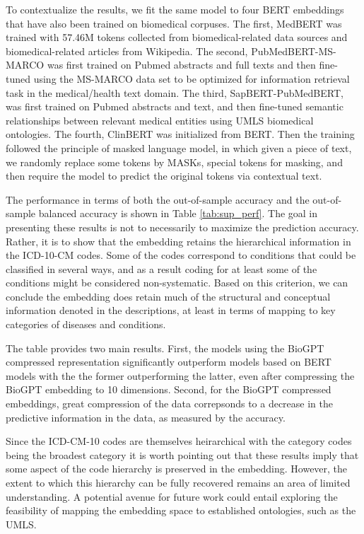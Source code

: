 \documentclass{bmcart}
\begin{document}
To contextualize the results, we fit the same model to four 
BERT embeddings that
have also been trained on biomedical corpuses. The first, MedBERT \cite{medbert}
was trained with 57.46M tokens collected from biomedical-related data sources 
and biomedical-related articles from Wikipedia. The second, 
PubMedBERT-MS-MARCO \cite{pubmedbertqa} was first trained on Pubmed abstracts 
and full texts and then fine-tuned using the MS-MARCO data set \cite{msmarco} 
to be optimized for information retrieval task in the medical/health text 
domain. The third, SapBERT-PubMedBERT, was first trained on Pubmed abstracts 
and text, and then fine-tuned semantic relationships between relevant
medical entities using UMLS \cite{umls} biomedical ontologies. The fourth, 
ClinBERT \cite{huang2019} was initialized from BERT. Then the training followed the principle of masked language model, in which given a piece of text, we randomly replace some tokens by MASKs, special tokens for masking, and then require the model to predict the original tokens via contextual text. 

The performance in terms of both the out-of-sample accuracy and
the out-of-sample balanced accuracy \cite{balancedaccuracy} is shown in 
Table \ref{tab:sup_perf}. The goal 
in presenting these results is not to necessarily to 
maximize the prediction accuracy. Rather, it is to show that the embedding 
retains the
hierarchical information in the ICD-10-CM codes. Some of the codes correspond to
conditions that could be classified in several ways, and as a result coding
for at least some of the conditions might be considered non-systematic.
Based on this criterion, we can conclude the embedding does retain much of the 
structural and conceptual information denoted in the descriptions, at least in 
terms of mapping to key categories of diseases and conditions.

The table provides two main results. First, the models using the BioGPT 
compressed representation significantly outperform models based on BERT
models with the the former outperforming the latter, even after compressing
the BioGPT embedding to 10 dimensions. Second, for the BioGPT compressed
embeddings, great compression of the data correpsonds to a decrease in
the predictive information in the data, as measured by the accuracy.

Since the ICD-CM-10 codes are themselves heirarchical with the category
codes being the broadest category it is worth pointing out that these results
imply that some aspect of the code hierarchy is preserved in the embedding.
However, the extent to which this hierarchy can be fully recovered remains an 
area of limited understanding. A potential avenue for future work could entail
exploring the feasibility of mapping the embedding space to established 
ontologies, such as the UMLS. 
\end{document}
